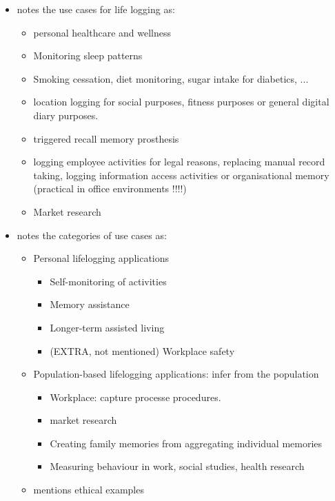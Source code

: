 \begin{itemize}
	\item \cite{gurrin2014lifelogging} notes the use cases for life logging as:
	\begin{itemize}
		\item personal healthcare and wellness
		\item Monitoring sleep patterns
		\item Smoking cessation, diet monitoring, sugar intake for diabetics, ...
		\item location logging for social purposes, fitness purposes or general digital diary purposes.
		\item triggered recall memory prosthesis
		\item logging employee activities for legal reasons, replacing manual record taking, logging information access activities or organisational memory (practical in office environments !!!!)
		\item Market research
	\end{itemize}

	\item \cite{gurrin2014lifelogging} notes the categories of use cases as:
	\begin{itemize}
		\item Personal lifelogging applications
		\begin{itemize}
			\item Self-monitoring of activities
			\item Memory assistance
			\item Longer-term assisted living
			\item (EXTRA, not mentioned) Workplace safety
		\end{itemize}
		\item Population-based lifelogging applications: infer from the population
		\begin{itemize}
			\item Workplace: capture processe procedures.
			\item market research
			\item Creating family memories from aggregating individual memories
			\item Measuring behaviour in work, social studies, health research
		\end{itemize}
		\item \cite{gurrin2014lifelogging} mentions ethical examples
	\end{itemize}
\end{itemize}

